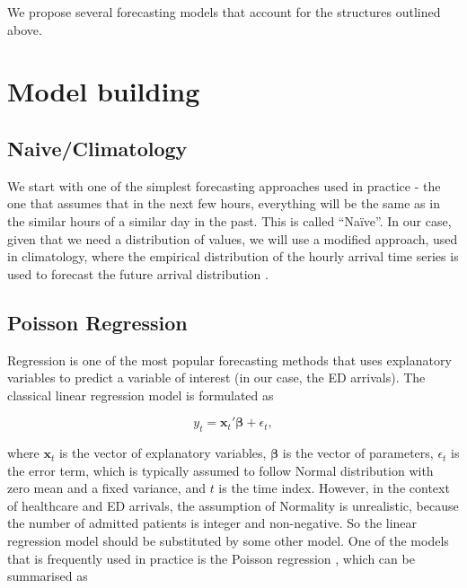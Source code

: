 \documentclass[]{elsarticle} %
\begin{document}
We propose several forecasting models that account for the structures outlined above.

\hypertarget{model}{%
\section{Model building}\label{model}}

\hypertarget{climatology}{%
\subsection{Naive/Climatology}\label{climatology}}

We start with one of the simplest forecasting approaches used in practice - the one that assumes that in the next few hours, everything will be the same as in the similar hours of a similar day in the past. This is called ``Naïve''. In our case, given that we need a distribution of values, we will use a modified approach, used in climatology, where the empirical distribution of the hourly arrival time series is used to forecast the future arrival distribution \citep{la2021new}.

\hypertarget{poisson-regression}{%
\subsection{Poisson Regression}\label{poisson-regression}}

Regression is one of the most popular forecasting methods that uses explanatory variables to predict a variable of interest (in our case, the ED arrivals). The classical linear regression model is formulated as

\begin{equation}
  {y}_t = \mathbf{x}_t' \boldsymbol{\beta} + \epsilon_t ,
\label{eq:linearRegression}
\end{equation}

where \(\mathbf{x}_t\) is the vector of explanatory variables, \(\boldsymbol{\beta}\) is the vector of parameters, \(\epsilon_t\) is the error term, which is typically assumed to follow Normal distribution with zero mean and a fixed variance, and \(t\) is the time index. However, in the context of healthcare and ED arrivals, the assumption of Normality is unrealistic, because the number of admitted patients is integer and non-negative. So the linear regression model should be substituted by some other model. One of the models that is frequently used in practice is the Poisson regression \citep[see for example,][]{mccarthy2008challenge}, which can be summarised as
\end{document}
